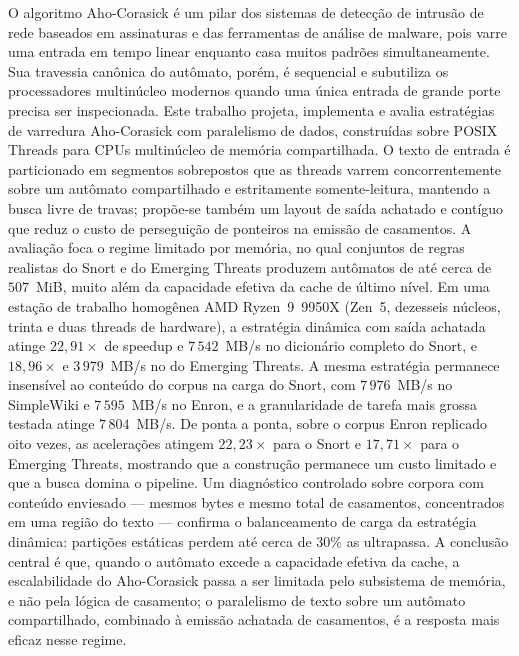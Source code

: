 O algoritmo Aho-Corasick é um pilar dos sistemas de detecção de intrusão de
rede baseados em assinaturas e das ferramentas de análise de malware, pois
varre uma entrada em tempo linear enquanto casa muitos padrões
simultaneamente. Sua travessia canônica do autômato, porém, é sequencial e
subutiliza os processadores multinúcleo modernos quando uma única entrada de
grande porte precisa ser inspecionada. Este trabalho projeta, implementa e
avalia estratégias de varredura Aho-Corasick com paralelismo de dados,
construídas sobre POSIX Threads para CPUs multinúcleo de memória
compartilhada. O texto de entrada é particionado em segmentos sobrepostos que
as threads varrem concorrentemente sobre um autômato compartilhado e
estritamente somente-leitura, mantendo a busca livre de travas; propõe-se
também um layout de saída achatado e contíguo que reduz o custo de
perseguição de ponteiros na emissão de casamentos. A avaliação foca o regime
limitado por memória, no qual conjuntos de regras realistas do Snort e do
Emerging Threats produzem autômatos de até cerca de $507$~MiB, muito além da    
capacidade efetiva da cache de último nível. Em uma estação de trabalho
homogênea AMD Ryzen~9~9950X (Zen~5, dezesseis núcleos, trinta e duas threads
de hardware), a estratégia dinâmica com saída achatada atinge $22{,}91\times$
de speedup e $7\,542$~MB/s no dicionário completo do Snort, e $18{,}96\times$
e $3\,979$~MB/s no do Emerging Threats. A mesma estratégia permanece
insensível ao conteúdo do corpus na carga do Snort, com $7\,976$~MB/s no
SimpleWiki e $7\,595$~MB/s no Enron, e a granularidade de tarefa mais grossa
testada atinge $7\,804$~MB/s. De ponta a ponta, sobre o corpus Enron replicado
oito vezes, as acelerações atingem $22{,}23\times$ para o Snort e
$17{,}71\times$ para o Emerging Threats, mostrando que a construção permanece
um custo limitado e que a busca domina o pipeline. Um diagnóstico controlado
sobre corpora com conteúdo enviesado --- mesmos bytes e mesmo total de
casamentos, concentrados em uma região do texto --- confirma o balanceamento
de carga da estratégia dinâmica: partições estáticas perdem até cerca de
$30\%$
as ultrapassa. A conclusão central é que, quando o autômato excede a
capacidade efetiva da cache, a escalabilidade do Aho-Corasick passa a ser
limitada pelo subsistema de memória, e não pela lógica de casamento; o
paralelismo de texto sobre um autômato compartilhado, combinado à emissão
achatada de casamentos, é a resposta mais eficaz nesse regime.
